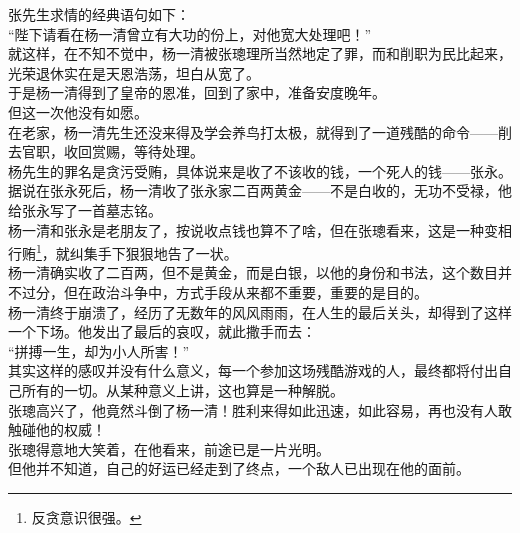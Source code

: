 \begin{multicols}{\theparacolNo}
张先生求情的经典语句如下：\\

“陛下请看在杨一清曾立有大功的份上，对他宽大处理吧！”\\

就这样，在不知不觉中，杨一清被张璁理所当然地定了罪，而和削职为民比起来，光荣退休实在是天恩浩荡，坦白从宽了。\\

于是杨一清得到了皇帝的恩准，回到了家中，准备安度晚年。\\

但这一次他没有如愿。\\

在老家，杨一清先生还没来得及学会养鸟打太极，就得到了一道残酷的命令——削去官职，收回赏赐，等待处理。\\

杨先生的罪名是贪污受贿，具体说来是收了不该收的钱，一个死人的钱——张永。\\

据说在张永死后，杨一清收了张永家二百两黄金——不是白收的，无功不受禄，他给张永写了一首墓志铭。\\

杨一清和张永是老朋友了，按说收点钱也算不了啥，但在张璁看来，这是一种变相行贿\footnote{反贪意识很强。}，就纠集手下狠狠地告了一状。\\

杨一清确实收了二百两，但不是黄金，而是白银，以他的身份和书法，这个数目并不过分，但在政治斗争中，方式手段从来都不重要，重要的是目的。\\

杨一清终于崩溃了，经历了无数年的风风雨雨，在人生的最后关头，却得到了这样一个下场。他发出了最后的哀叹，就此撒手而去：\\

“拼搏一生，却为小人所害！”\\

其实这样的感叹并没有什么意义，每一个参加这场残酷游戏的人，最终都将付出自己所有的一切。从某种意义上讲，这也算是一种解脱。\\

张璁高兴了，他竟然斗倒了杨一清！胜利来得如此迅速，如此容易，再也没有人敢触碰他的权威！\\

张璁得意地大笑着，在他看来，前途已是一片光明。\\

但他并不知道，自己的好运已经走到了终点，一个敌人已出现在他的面前。\\
\ifnum{}
	\end{multicols}
\fi
\newpage
